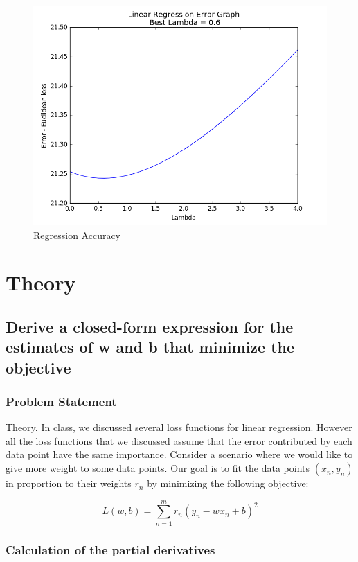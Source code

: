 \documentclass[a4paper]{article}
\begin{document}
\begin{figure}[h]
    \centering
    \includegraphics[width=\textwidth]{images/linear_regression_accuracy.png}
    \caption{Regression Accuracy}
    \label{fig_regression_accuracy}
\end{figure}

\newpage

\section{Theory}

\subsection{Derive a closed-form expression for the estimates of w and b that minimize the objective}

\subsubsection{Problem Statement}

Theory. In class, we discussed several loss functions for linear regression. However all the loss functions that we discussed assume that the error contributed by each data point have the same importance. Consider a scenario where we would like to give more weight to some data points. Our goal is to fit the data points $(x_n , y_n )$ in proportion to their weights $r_n$ by minimizing the following objective:

$$L(w, b) = \sum_{n=1}^m r_n (y_n - wx_n + b)^2$$


\subsubsection{Calculation of the partial derivatives}
\end{document}
